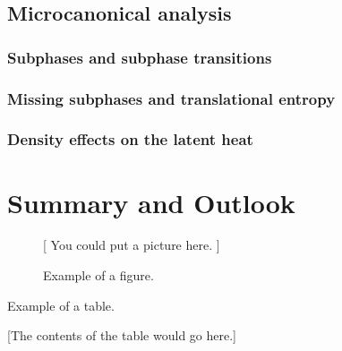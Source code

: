 \documentclass[12pt]{report}
\begin{document}
\section{Microcanonical analysis}
\subsection{Subphases and subphase transitions}
\subsection{Missing subphases and translational entropy}
\subsection{Density effects on the latent heat}

\chapter{Summary and Outlook}










\begin{figure}
\centerline{[ You could put a picture here. ]}
\caption{Example of a figure.}
\end{figure}

\begin{table}
\caption{Example of a table.}
\centerline{[The contents of the table would go here.]}
\end{table}
\end{document}
